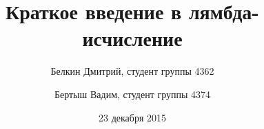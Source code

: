\documentclass{article}
\begin{document}
\title{Краткое введение в лямбда-исчисление}
\author{Белкин Дмитрий, студент группы 4362
\and Бертыш Вадим, студент группы 4374}
\date{23 декабря 2015}
\maketitle
\newpage





\end{document}
